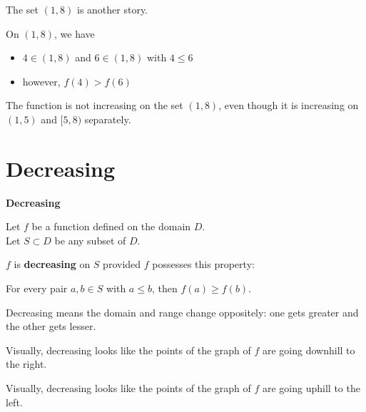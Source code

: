 \documentclass{ximera}
\begin{document}
The set $(1,8)$ is another story.


On $(1,8)$, we have 

\begin{itemize}
\item $4 \in (1,8)$  and  $6 \in (1,8)$  with $4 \leq 6$ \\

\item however, $f(4) > f(6)$
\end{itemize}


The function is not increasing on the set $(1,8)$, even though it is increasing on $(1,5)$ and $[5,8)$ separately. \\














\section{Decreasing}



\begin{definition} \textbf{\textcolor{green!50!black}{Decreasing}} 


Let $f$ be a function defined on the domain $D$. \\
Let $S \subset D$ be any subset of $D$.

$f$ is \textbf{decreasing} on $S$ provided $f$ possesses this property:  


\begin{center}
For every pair $a, b \in S$ with $a \leq b$, then $f(a) \geq f(b)$.
\end{center}

\end{definition}




\begin{idea}
Decreasing means the domain and range change oppositely: one gets greater and the other gets lesser.
\end{idea}


\begin{observation}
Visually, decreasing looks like the points of the graph of $f$ are going downhill to the right.
\end{observation}

\begin{observation}
Visually, decreasing looks like the points of the graph of $f$ are going uphill to the left.
\end{observation}
\end{document}
